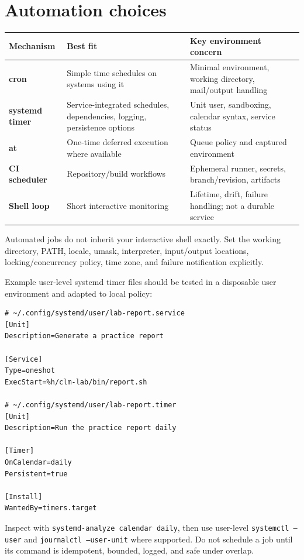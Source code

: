 \documentclass[11pt,oneside,openany]{book}
\begin{document}
\section{Automation choices}
\begin{center}
\begin{tabularx}{0.96\textwidth}{>{\bfseries}p{}X X}
\toprule
Mechanism & Best fit & Key environment concern \\
\midrule
cron & Simple time schedules on systems using it & Minimal environment, working directory, mail/output handling \\
systemd timer & Service-integrated schedules, dependencies, logging, persistence options & Unit user, sandboxing, calendar syntax, service status \\
at & One-time deferred execution where available & Queue policy and captured environment \\
CI scheduler & Repository/build workflows & Ephemeral runner, secrets, branch/revision, artifacts \\
Shell loop & Short interactive monitoring & Lifetime, drift, failure handling; not a durable service \\
\bottomrule
\end{tabularx}
\end{center}

Automated jobs do not inherit your interactive shell exactly. Set the working directory, PATH, locale, umask, interpreter, input/output locations, locking/concurrency policy, time zone, and failure notification explicitly.

Example user-level systemd timer files should be tested in a disposable user environment and adapted to local policy:
\begin{lstlisting}
# ~/.config/systemd/user/lab-report.service
[Unit]
Description=Generate a practice report

[Service]
Type=oneshot
ExecStart=%h/clm-lab/bin/report.sh

# ~/.config/systemd/user/lab-report.timer
[Unit]
Description=Run the practice report daily

[Timer]
OnCalendar=daily
Persistent=true

[Install]
WantedBy=timers.target
\end{lstlisting}
Inspect with \texttt{systemd-analyze calendar daily}, then use user-level \texttt{systemctl --user} and \texttt{journalctl --user-unit} where supported. Do not schedule a job until its command is idempotent, bounded, logged, and safe under overlap.
\end{document}
